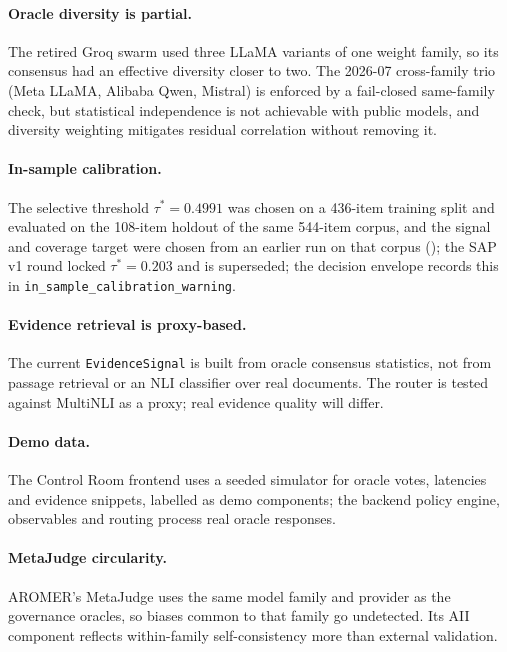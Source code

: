 \documentclass[10pt,twocolumn]{article}
\begin{document}
\paragraph{Oracle diversity is partial.}
The retired Groq swarm used three LLaMA variants of one weight family, so
its consensus had an effective diversity closer to two. The 2026-07
cross-family trio (Meta LLaMA, Alibaba Qwen, Mistral) is enforced by a
fail-closed same-family check, but statistical independence is not
achievable with public models, and diversity weighting mitigates residual
correlation without removing it.

\paragraph{In-sample calibration.}
The selective threshold $\tau^* = 0.4991$ was chosen on a 436-item training
split and evaluated on the 108-item holdout of the same 544-item corpus, and
the signal and coverage target were chosen from an earlier run on that corpus
(); the SAP v1 round
locked $\tau^* = 0.203$ and is superseded; the decision envelope records this in
\texttt{in\_sample\_calibration\_warning}.

\paragraph{Evidence retrieval is proxy-based.}
The current \texttt{EvidenceSignal} is built from oracle consensus
statistics, not from passage retrieval or an NLI classifier over real
documents. The router is tested against MultiNLI as a proxy; real evidence
quality will differ.

\paragraph{Demo data.}
The Control Room frontend uses a seeded simulator for oracle votes,
latencies and evidence snippets, labelled as demo components; the backend
policy engine, observables and routing process real oracle responses.

\paragraph{MetaJudge circularity.}
AROMER's MetaJudge uses the same model family and provider as the
governance oracles, so biases common to that family go undetected. Its AII
component reflects within-family self-consistency more than external
validation.
\end{document}
